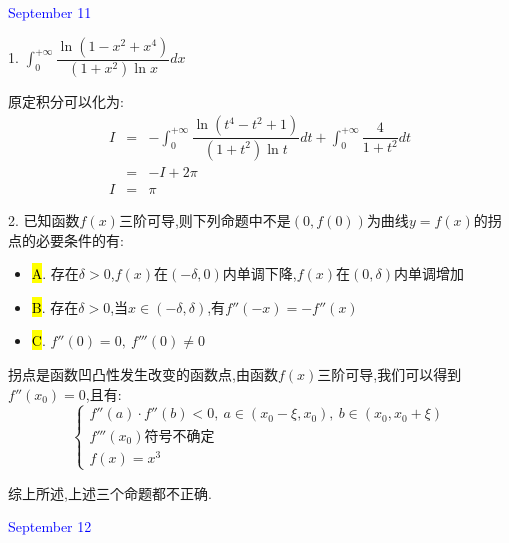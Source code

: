 \textcolor{blue}{September 11}

1. $\int_{0}^{+\infty}\dfrac{\ln(1-x^2+x^4)}{(1+x^2)\ln x}dx$
\begin{solution}

	原定积分可以化为:  
	\begin{eqnarray*}
		I&=&-\int_{0}^{+\infty}\dfrac{\ln (t^4-t^2+1)}{(1+t^2)\ln t}dt+\int_{0}^{+\infty}\dfrac{4}{1+t^2}dt\\
		&=&-I+2\pi\\
		I&=&\pi
	\end{eqnarray*}
\end{solution}

2. 已知函数$f(x)$三阶可导,则下列命题中不是$(0,f(0))$为曲线$y=f(x)$的拐点的必要条件的有:  
\begin{itemize}
	\item \hl{A}. 存在$\delta>0$,$f(x)$在$(-\delta,0)$内单调下降,$f(x)$在$(0,\delta)$内单调增加
	\item \hl{B}. 存在$\delta>0$,当$x\in(-\delta,\delta)$,有$f''(-x)=-f''(x)$
	\item \hl{C}. $f''(0)=0,\ f'''(0)\neq 0$
\end{itemize}
\begin{solution}

	拐点是函数凹凸性发生改变的函数点,由函数$f(x)$三阶可导,我们可以得到$f''(x_{0})=0$,且有:  
	$$\left\lbrace
	\begin{array}{l}
		f''(a)\cdot f''(b)<0,\ a\in(x_{0}-\xi,x_{0}),\ b\in(x_{0},x_{0}+\xi)\\
		f'''(x_{0})\text{符号不确定}\\
		f(x)=x^3
	\end{array}
	\right. $$
	
	综上所述,上述三个命题都不正确.
\end{solution}

\textcolor{blue}{September 12}

